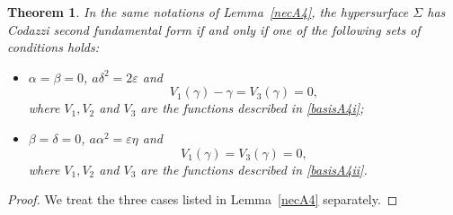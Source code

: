 \documentclass{amsart}
\theoremstyle{plain}
\newtheorem{theorem}{Theorem}
\theoremstyle{remark}
\begin{document}
{\begin{theorem}\label{codA4}
In the same notations of Lemma~{\em \ref{necA4}}, the hypersurface $\Sigma$ has Codazzi second fundamental form if and only if one of the following sets of conditions holds: 
%
\begin{itemize}
\item[(i)] $\alpha=\beta=0$, $a\delta^2 = 2\varepsilon$ and
%
\begin{equation}\label{intA4i}
V_1(\gamma)-\gamma = V_3(\gamma)= 0,
\end{equation}
where $V_1,V_2$ and $V_3$ are the functions described in \eqref{basisA4i}; 
\item[(ii)] $\beta=\delta=0$, $a \alpha^2 = \varepsilon \eta$ and
\begin{equation}\label{intA4ii}
V_1(\gamma) = V_3(\gamma) = 0,
\end{equation}
where $V_1,V_2$ and $V_3$ are the functions described in \eqref{basisA4ii}. 
\end{itemize}
\end{theorem} 

\begin{proof}
We treat the three cases listed in Lemma~\ref{necA4} separately. 


\end{proof}}
\end{document}
